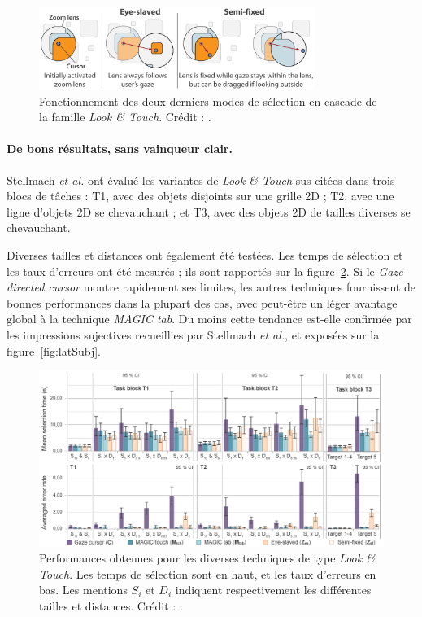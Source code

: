 	\begin{figure}[!htb]
		\centering
		\includegraphics[width=0.8\textwidth]{figures/ch2/lookandtouch2}
		\caption[\emph{Look \&{} Touch -- principe II}]{Fonctionnement des deux derniers modes de sélection en cascade de la famille \emph{Look \&{} Touch}. Crédit : \cite{stellmach2012look}.}
		\label{fig:lookandtouch2}
	\end{figure}
	
	\paragraph{De bons résultats, sans vainqueur clair.}
	Stellmach \emph{et al.} ont évalué les variantes de \emph{Look \&{} Touch} sus-citées dans trois blocs de tâches : T1, avec des objets disjoints sur une grille 2D ; T2, avec une ligne d'objets 2D se chevauchant ; et T3, avec des objets 2D de tailles diverses se chevauchant.
	
	Diverses tailles et distances ont également été testées. Les temps de sélection et les taux d'erreurs ont été mesurés ; ils sont rapportés sur la figure~\ref{fig:latRes}. Si le \emph{Gaze-directed cursor} montre rapidement ses limites, les autres techniques fournissent de bonnes performances dans la plupart des cas, avec peut-être un léger avantage global à la technique \emph{MAGIC tab}. Du moins cette tendance est-elle confirmée par les impressions sujectives recueillies par Stellmach \emph{et al.}, et exposées sur la figure~\ref{fig:latSubj}.

	\begin{figure}[!htb]
		\centering
		\includegraphics[width=\textwidth]{figures/ch2/latRes}
		\caption[\emph{Look \&{} Touch -- performances}]{Performances obtenues pour les diverses techniques de type \emph{Look \&{} Touch}. Les temps de sélection sont en haut, et les taux d'erreurs en bas. Les mentions $S_{i}$ et $D_{i}$ indiquent respectivement les différentes tailles et distances. Crédit : \cite{stellmach2012look}.}
		\label{fig:latRes}
	\end{figure}
	
